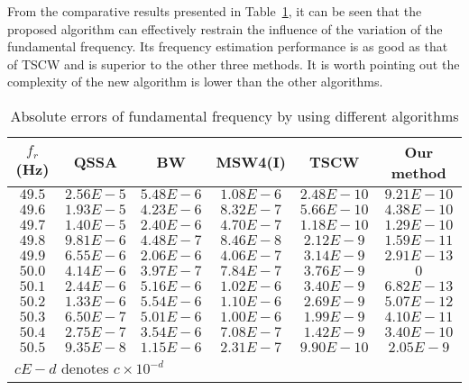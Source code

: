 \documentclass[journal,twoside]{IEEEtran}
\begin{document}
From the comparative results presented in Table~\ref{table_2}, it can be seen that the proposed algorithm can effectively restrain the influence of the variation of the fundamental frequency. Its frequency estimation performance is as good as that of TSCW and is superior to the other three methods. It is worth pointing out the complexity of the new algorithm is lower than the other algorithms.
\begin{table}
	\renewcommand{\arraystretch}{1.3}
	\caption{Absolute errors of fundamental frequency by using different algorithms}
	\label{table_2}
	\centering
	\begin{tabular}{@{ }c@{ }@{ }c@{ }@{ }c@{ }@{ }c@{ }@{ }c@{ }@{ }c@{ }}
		\toprule
		$f_r$ (Hz) & QSSA      & BW        & MSW4(I)   & TSCW       & \textbf{Our method}\\
		\midrule
		$49.5$     & $2.56E-5$ & $5.48E-6$ & $1.08E-6$ & $2.48E-10$ & $9.21E-10$ \\
		$49.6$     & $1.93E-5$ & $4.23E-6$ & $8.32E-7$ & $5.66E-10$ & $4.38E-10$ \\
		$49.7$     & $1.40E-5$ & $2.40E-6$ & $4.70E-7$ & $1.18E-10$ & $1.29E-10$ \\
		$49.8$     & $9.81E-6$ & $4.48E-7$ & $8.46E-8$ & $2.12E-9$  & $1.59E-11$ \\
		$49.9$     & $6.55E-6$ & $2.06E-6$ & $4.06E-7$ & $3.14E-9$  & $2.91E-13$ \\
		$50.0$     & $4.14E-6$ & $3.97E-7$ & $7.84E-7$ & $3.76E-9$  & $0$        \\
		$50.1$     & $2.44E-6$ & $5.16E-6$ & $1.02E-6$ & $3.40E-9$  & $6.82E-13$ \\
		$50.2$     & $1.33E-6$ & $5.54E-6$ & $1.10E-6$ & $2.69E-9$  & $5.07E-12$ \\
		$50.3$     & $6.50E-7$ & $5.01E-6$ & $1.00E-6$ & $1.99E-9$  & $4.10E-11$ \\
		$50.4$     & $2.75E-7$ & $3.54E-6$ & $7.08E-7$ & $1.42E-9$  & $3.40E-10$ \\
		$50.5$     & $9.35E-8$ & $1.15E-6$ & $2.31E-7$ & $9.90E-10$ & $2.05E-9$ \\
		\bottomrule
		\multicolumn{6}{l}{$cE-d$ denotes $c\times10^{-d}$}\\
	\end{tabular}
\end{table}
\end{document}
